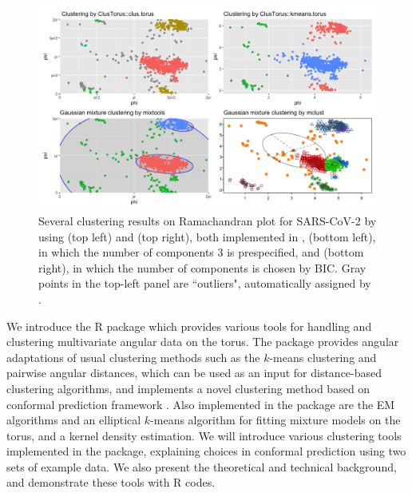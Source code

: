  \begin{figure}
     \centering
     \includegraphics[scale = 0.39]{covid19.png}
     \caption{Several clustering results on Ramachandran plot for SARS-CoV-2 by using  (top left) and  (top right), both implemented in ,  (bottom left), in which the number of components 3 is prespecified, and  (bottom right), in which the number of components is chosen by BIC. Gray points in the top-left panel are ``outliers", automatically assigned by .}
     \label{fig:covid}
 \end{figure}

 We introduce the R package  \citep{ClusTorus} which provides various tools for handling and clustering multivariate angular data on the torus. The package provides angular adaptations of usual clustering methods such as the $k$-means clustering and  pairwise angular distances, which can be used as an input for distance-based clustering algorithms, and implements a novel clustering method based on conformal prediction framework \citep{Vovk}. Also implemented in the package are the EM algorithms and an elliptical $k$-means algorithm for fitting mixture models on the torus, and a kernel density estimation. We will introduce various clustering tools implemented in the package, explaining choices in conformal prediction using two sets of example data. We also present the theoretical and technical background, and demonstrate these tools with R codes.

